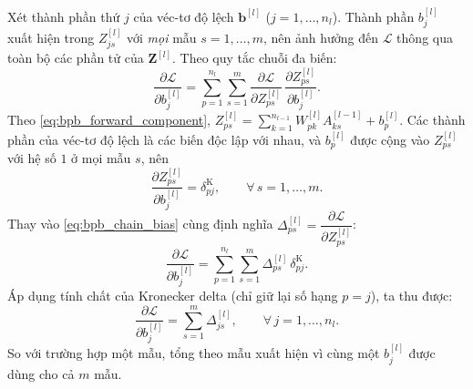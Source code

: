 Xét thành phần thứ $j$ của véc-tơ độ lệch $\mathbf{b}^{[l]}$ ($j = 1,\dots,n_l$). Thành phần $b_j^{[l]}$ xuất hiện trong $Z_{js}^{[l]}$ với \emph{mọi} mẫu $s = 1,\dots,m$, nên ảnh hưởng đến $\mathcal{L}$ thông qua toàn bộ các phần tử của $\mathbf{Z}^{[l]}$. Theo quy tắc chuỗi đa biến:
\begin{equation}
\frac{\partial\mathcal{L}}{\partial b_j^{[l]}} = \sum_{p=1}^{n_l}\sum_{s=1}^{m} \frac{\partial\mathcal{L}}{\partial Z_{ps}^{[l]}}\,\frac{\partial Z_{ps}^{[l]}}{\partial b_j^{[l]}}.
\label{eq:bpb_chain_bias}
\end{equation}
Theo \eqref{eq:bpb_forward_component}, $Z_{ps}^{[l]} = \sum_{k=1}^{n_{l-1}} W_{pk}^{[l]}A_{ks}^{[l-1]} + b_p^{[l]}$. Các thành phần của véc-tơ độ lệch là các biến độc lập với nhau, và $b_p^{[l]}$ được cộng vào $Z_{ps}^{[l]}$ với hệ số $1$ ở mọi mẫu $s$, nên
\begin{equation}
\frac{\partial Z_{ps}^{[l]}}{\partial b_j^{[l]}} = \delta^{\mathrm{K}}_{pj}, \qquad \forall\, s = 1,\dots,m.
\end{equation}
Thay vào \eqref{eq:bpb_chain_bias} cùng định nghĩa $\Delta_{ps}^{[l]} = \dfrac{\partial\mathcal{L}}{\partial Z_{ps}^{[l]}}$:
\begin{equation}
\frac{\partial\mathcal{L}}{\partial b_j^{[l]}} = \sum_{p=1}^{n_l}\sum_{s=1}^{m} \Delta_{ps}^{[l]}\,\delta^{\mathrm{K}}_{pj}.
\end{equation}
Áp dụng tính chất của Kronecker delta (chỉ giữ lại số hạng $p = j$), ta thu được:
\begin{equation}
\frac{\partial\mathcal{L}}{\partial b_j^{[l]}} = \sum_{s=1}^{m}\Delta_{js}^{[l]}, \qquad \forall\, j = 1,\dots,n_l.
\label{eq:bpb_bias_component}
\end{equation}
So với trường hợp một mẫu, tổng theo mẫu xuất hiện vì cùng một $b_j^{[l]}$ được dùng cho cả $m$ mẫu.
 
